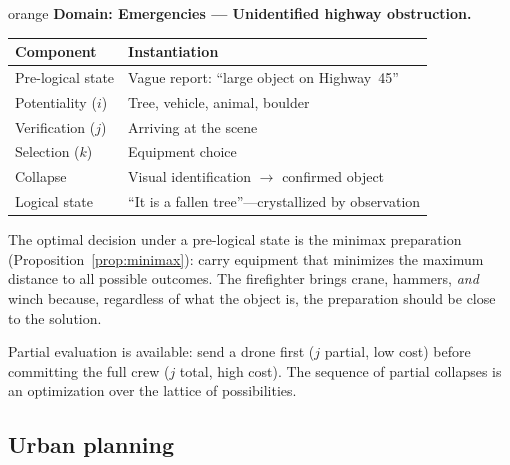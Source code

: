 \documentclass[11pt,a4paper]{article}
\begin{document}
\begin{domainbox}{orange}
\textbf{Domain: Emergencies --- Unidentified highway obstruction.}

\begin{tabularx}{\textwidth}{l Y}
\toprule
\textbf{Component} & \textbf{Instantiation} \\
\midrule
Pre-logical state & Vague report: ``large object on Highway~45'' \\
Potentiality ($i$) & Tree, vehicle, animal, boulder \\
Verification ($j$) & Arriving at the scene \\
Selection ($k$) & Equipment choice \\
Collapse & Visual identification $\to$ confirmed object \\
Logical state & ``It is a fallen tree''---crystallized by observation \\
\bottomrule
\end{tabularx}

The optimal decision under a pre-logical state is the minimax preparation
(Proposition~\ref{prop:minimax}): carry equipment that minimizes the
maximum distance to all possible outcomes. The firefighter brings crane,
hammers, \emph{and} winch because, regardless of what the object is, the
preparation should be close to the solution.

Partial evaluation is available: send a drone first ($j$ partial, low
cost) before committing the full crew ($j$ total, high cost). The
sequence of partial collapses is an optimization over the lattice of
possibilities.
\end{domainbox}

\subsection{Urban planning}
\end{document}
